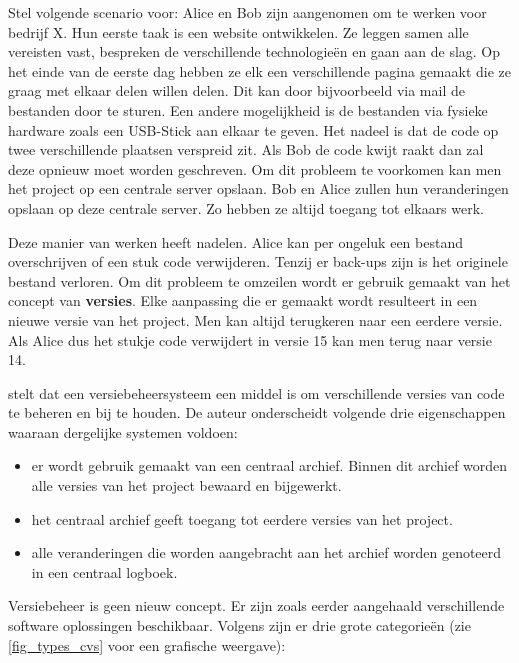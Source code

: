 Stel volgende scenario voor: Alice en Bob zijn aangenomen om te werken voor bedrijf X. Hun eerste taak is een website ontwikkelen. Ze leggen samen alle vereisten vast, bespreken de verschillende technologieën en gaan aan de slag. Op het einde van de eerste dag hebben ze elk een verschillende pagina gemaakt die ze graag met elkaar delen willen delen. Dit kan door bijvoorbeeld via mail de bestanden door te sturen. Een andere mogelijkheid is de bestanden via fysieke hardware zoals een USB-Stick aan elkaar te geven. Het nadeel is dat de code op twee verschillende plaatsen verspreid zit. Als Bob de code kwijt raakt dan zal deze opnieuw moet worden geschreven. Om dit probleem te voorkomen kan men het project op een centrale server opslaan. Bob en Alice zullen hun veranderingen opslaan op deze centrale server. Zo hebben ze altijd toegang tot elkaars werk. 

Deze manier van werken heeft nadelen. Alice kan per ongeluk een bestand overschrijven of een stuk code verwijderen. Tenzij er back-ups zijn is het originele bestand verloren. Om dit probleem te omzeilen wordt er gebruik gemaakt van het concept van \textbf{versies}. Elke aanpassing die er gemaakt wordt resulteert in een nieuwe versie van het project. Men kan altijd terugkeren naar een eerdere versie. Als Alice dus het stukje code verwijdert in versie 15 kan men terug naar versie 14.

\textcite{Loeliger2009} stelt dat een versiebeheersysteem een middel is om verschillende versies van code te beheren en bij te houden. De auteur onderscheidt volgende drie eigenschappen waaraan dergelijke systemen voldoen:

\begin{itemize}
	\item er wordt gebruik gemaakt van een centraal archief. Binnen dit archief worden alle versies van het project bewaard en bijgewerkt.
	\item het centraal archief geeft toegang tot eerdere versies van het project.
	\item alle veranderingen die worden aangebracht aan het archief worden genoteerd in een centraal logboek.
\end{itemize}

Versiebeheer is geen nieuw concept. Er zijn zoals eerder aangehaald verschillende software oplossingen beschikbaar. Volgens \textcite{Chacon2014} zijn er drie grote categorieën (zie \ref{fig_types_cvs} voor een grafische weergave):

